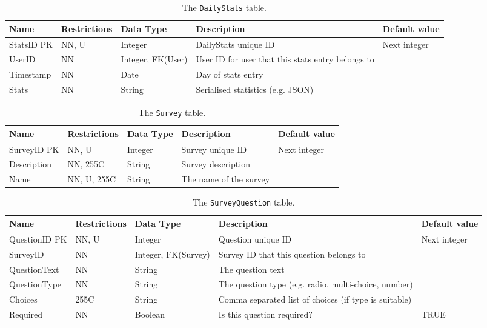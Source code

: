 \begin{table}[H]
  \centering
  \caption{The \texttt{DailyStats} table.}
    \begin{tabularx}{\textwidth}{llp{2.5cm}Xl}
    \hline
    Name  & Restrictions & Data Type & Description & Default value \\
    \hline
    StatsID PK & NN, U & Integer & DailyStats unique ID & Next integer \\
    UserID & NN    & Integer, FK(User) & User ID for user that this stats entry belongs to &  \\
    Timestamp & NN    & Date  & Day of stats entry &  \\
    Stats & NN    & String & Serialised statistics (e.g. JSON) &  \\
    \hline
    \end{tabularx}%
  \label{tab:dd:DailyStats}%
\end{table}%


\begin{table}[H]
  \centering
  \caption{The \texttt{Survey} table.}
    \begin{tabularx}{\textwidth}{lllXl}
    \hline
    Name  & Restrictions & Data Type & Description & Default value \\
    \hline
    SurveyID PK & NN, U & Integer & Survey unique ID & Next integer \\
    Description & NN, 255C & String & Survey description &  \\
    Name  & NN, U, 255C & String & The name of the survey &  \\
    \hline
    \end{tabularx}%
  \label{tab:dd:Survey}%
\end{table}%


\begin{table}[H]
  \centering
  \caption{The \texttt{SurveyQuestion} table.}
    \begin{tabularx}{\textwidth}{llp{2.5cm}Xl}
    \hline
    Name  & Restrictions & Data Type & Description & Default value \\
    \hline
    QuestionID PK & NN, U & Integer & Question unique ID & Next integer \\
    SurveyID & NN    & Integer, FK(Survey) & Survey ID that this question belongs to &  \\
    QuestionText & NN    & String & The question text &  \\
    QuestionType & NN    & String & The question type (e.g. radio, multi-choice, number) &  \\
    Choices & 255C  & String & Comma separated list of choices (if type is suitable) &  \\
    Required & NN    & Boolean & Is this question required? & TRUE \\
    \hline
    \end{tabularx}%
  \label{tab:dd:SurveyQuestion}%
\end{table}%


